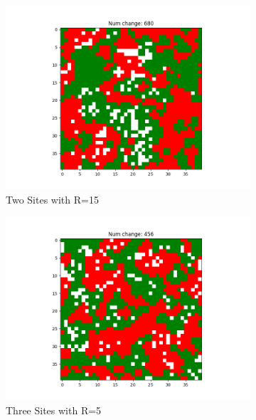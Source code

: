 \documentclass[11pt]{article}
\begin{document}
\begin{figure}[h]
\begin{subfigure}{0.14\textwidth}
			\includegraphics[width=\linewidth]{policy3_final_h2r15.png}
			\caption{\centering Two Sites with R=15}
		\end{subfigure}\hfill
		\begin{subfigure}{0.14\textwidth}
			\includegraphics[width=\linewidth]{policy3_final_h3r5.png}
			\caption{\centering Three Sites with R=5}
			\label{p3_h3r5}
		\end{subfigure}\hfill
		\begin{subfigure}{0.14\textwidth}

\end{subfigure}
\end{figure}
\end{document}
